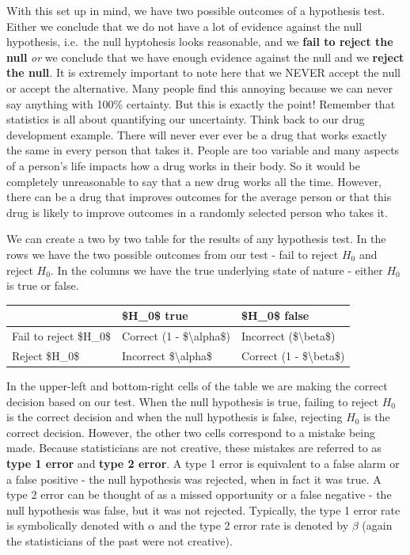 \documentclass[
]{book}
\theoremstyle{definition}
\theoremstyle{definition}
\theoremstyle{definition}
\theoremstyle{remark}
\begin{document}
With this set up in mind, we have two possible outcomes of a hypothesis test. Either we conclude that we do not have a lot of evidence against the null hypothesis, i.e.~the null hyptohesis looks reasonable, and we \textbf{fail to reject the null} \emph{or} we conclude that we have enough evidence against the null and we \textbf{reject the null}. It is extremely important to note here that we NEVER accept the null or accept the alternative. Many people find this annoying because we can never say anything with 100\% certainty. But this is exactly the point! Remember that statistics is all about quantifying our uncertainty. Think back to our drug development example. There will never ever ever be a drug that works exactly the same in every person that takes it. People are too variable and many aspects of a person's life impacts how a drug works in their body. So it would be completely unreasonable to say that a new drug works all the time. However, there can be a drug that improves outcomes for the average person or that this drug is likely to improve outcomes in a randomly selected person who takes it.

We can create a two by two table for the results of any hypothesis test. In the rows we have the two possible outcomes from our test - fail to reject \(H_0\) and reject \(H_0\). In the columns we have the true underlying state of nature - either \(H_0\) is true or false.

\begin{table}[H]
\centering
\begin{tabular}[t]{l|>{\raggedright\arraybackslash}p{4em}|>{\raggedright\arraybackslash}p{4em}}
\hline
  & \$H\_0\$ true & \$H\_0\$ false\\
\hline
Fail to reject \$H\_0\$ & Correct (1 - \$\textbackslash{}alpha\$) & Incorrect (\$\textbackslash{}beta\$)\\
\hline
Reject \$H\_0\$ & Incorrect \$\textbackslash{}alpha\$ & Correct (1 - \$\textbackslash{}beta\$)\\
\hline
\end{tabular}
\end{table}

In the upper-left and bottom-right cells of the table we are making the correct decision based on our test. When the null hypothesis is true, failing to reject \(H_0\) is the correct decision and when the null hypothesis is false, rejecting \(H_0\) is the correct decision. However, the other two cells correspond to a mistake being made. Because statisticians are not creative, these mistakes are referred to as \textbf{type 1 error} and \textbf{type 2 error}. A type 1 error is equivalent to a false alarm or a false positive - the null hypothesis was rejected, when in fact it was true. A type 2 error can be thought of as a missed opportunity or a false negative - the null hypothesis was false, but it was not rejected. Typically, the type 1 error rate is symbolically denoted with \(\alpha\) and the type 2 error rate is denoted by \(\beta\) (again the statisticians of the past were not creative).
\end{document}
